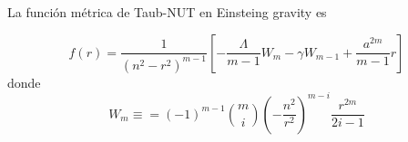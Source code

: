 La función métrica de Taub-NUT en Einsteing gravity es
\begin{tcolorbox}
\begin{equation*}
   f(r)= \frac{1}{(n^2-r^2)^{m-1}}\left[-\frac{\Lambda}{m-1}W_m-\gamma W_{m-1}+\frac{a^{2m}}{m-1}r\right]
\end{equation*}
donde
\begin{equation*}
    W_m\equiv =(-1)^{m-1}\binom{m}{i}\left(-\frac{n^2}{r^2}\right)^{m-i}\frac{r^{2m}}{2i-1}
\end{equation*}
\end{tcolorbox}


